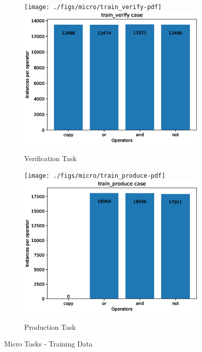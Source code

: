 \begin{figure}[ht] 
	\begin{subfigure}[b]{0.5\linewidth}
		\centering
		\ifpdf
		\texttt{[image: ./figs/micro/train\_verify-pdf]}
		\else
		\includegraphics[width=0.95\linewidth]{./figs/micro/train_verify-eps}
		\fi
		\caption{Verification Task} 
		\label{tr_ver} 
		\vspace{2ex}
	\end{subfigure}%
	\begin{subfigure}[b]{0.5\linewidth}
		\centering
		\ifpdf
		\texttt{[image: ./figs/micro/train\_produce-pdf]}
		\else
		\includegraphics[width=0.95\linewidth]{./figs/micro/train_produce-eps}
		\fi 
		\caption{Production Task} 
		\label{tr_prd} 
		\vspace{2ex}
	\end{subfigure}
	\caption{Micro Tasks - Training Data}
	\label{micro_train}
\end{figure}


